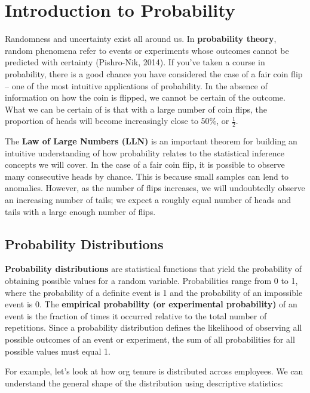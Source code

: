 \documentclass[
]{book}
\begin{document}
\hypertarget{introduction-to-probability}{%
\section{Introduction to Probability}\label{introduction-to-probability}}

Randomness and uncertainty exist all around us. In \textbf{probability theory}, random phenomena refer to events or experiments whose outcomes cannot be predicted with certainty (Pishro-Nik, 2014). If you've taken a course in probability, there is a good chance you have considered the case of a fair coin flip -- one of the most intuitive applications of probability. In the absence of information on how the coin is flipped, we cannot be certain of the outcome. What we can be certain of is that with a large number of coin flips, the proportion of heads will become increasingly close to 50\%, or \(\frac{1}{2}\).

The \textbf{Law of Large Numbers (LLN)} is an important theorem for building an intuitive understanding of how probability relates to the statistical inference concepts we will cover. In the case of a fair coin flip, it is possible to observe many consecutive heads by chance. This is because small samples can lend to anomalies. However, as the number of flips increases, we will undoubtedly observe an increasing number of tails; we expect a roughly equal number of heads and tails with a large enough number of flips.

\hypertarget{probability-distributions}{%
\subsection{Probability Distributions}\label{probability-distributions}}

\textbf{Probability distributions} are statistical functions that yield the probability of obtaining possible values for a random variable. Probabilities range from 0 to 1, where the probability of a definite event is 1 and the probability of an impossible event is 0. The \textbf{empirical probability (or experimental probability)} of an event is the fraction of times it occurred relative to the total number of repetitions. Since a probability distribution defines the likelihood of observing all possible outcomes of an event or experiment, the sum of all probabilities for all possible values must equal 1.

For example, let's look at how org tenure is distributed across employees. We can understand the general shape of the distribution using descriptive statistics:
\end{document}

